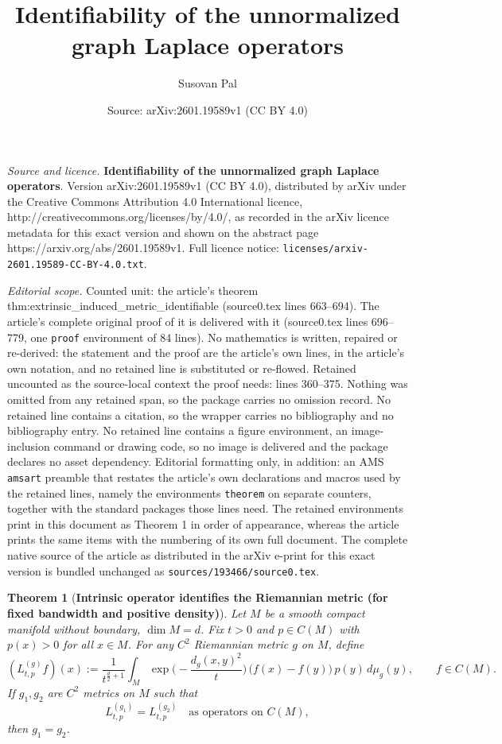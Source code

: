\documentclass[10pt,a4paper]{amsart}
\title{\large \textbf{Identifiability of the unnormalized graph Laplace operators}}
\author{Susovan Pal}
\date{Source: arXiv:2601.19589v1 (CC BY 4.0)}
\newtheorem{theorem}{Theorem}
\begin{document}
\maketitle

\noindent\emph{Source and licence.} \large \textbf{Identifiability of the unnormalized graph Laplace operators}. Version arXiv:2601.19589v1 (CC BY 4.0), distributed by arXiv under the Creative Commons Attribution 4.0 International licence, http://creativecommons.org/licenses/by/4.0/, as recorded in the arXiv licence metadata for this exact version and shown on the abstract page https://arxiv.org/abs/2601.19589v1. Full licence notice: \texttt{licenses/arxiv-2601.19589-CC-BY-4.0.txt}.\par\smallskip

\noindent\textit{Editorial scope.} Counted unit: the article's theorem thm:extrinsic\_induced\_metric\_identifiable (source0.tex lines 663--694). The article's complete original proof of it is delivered with it (source0.tex lines 696--779, one \texttt{proof} environment of 84 lines). No mathematics is written, repaired or re-derived: the statement and the proof are the article's own lines, in the article's own notation, and no retained line is substituted or re-flowed.  Retained uncounted as the source-local context the proof needs: lines 360--375.  Nothing was omitted from any retained span, so the package carries no omission record.  No retained line contains a citation, so the wrapper carries no bibliography and no bibliography entry.  No retained line contains a figure environment, an image-inclusion command or drawing code, so no image is delivered and the package declares no asset dependency.  Editorial formatting only, in addition: an AMS \texttt{amsart} preamble that restates the article's own declarations and macros used by the retained lines, namely the environments \texttt{theorem} on separate counters, together with the standard packages those lines need.  The retained environments print in this document as Theorem 1 in order of appearance, whereas the article prints the same items with the numbering of its own full document.  The complete native source of the article as distributed in the arXiv e-print for this exact version is bundled unchanged as \texttt{sources/193466/source0.tex}.
\begin{theorem}[\textbf{Intrinsic operator identifies the Riemannian metric (for fixed bandwidth and positive density)}]
\label{thm:intrinsic_metric_identifiable}
Let $M$ be a smooth compact manifold without boundary, $\dim M=d$.
Fix $t>0$ and $p\in C(M)$ with $p(x)>0$ for all $x\in M$.
For any $C^2$ Riemannian metric $g$ on $M$, define
\[
(L^{(g)}_{t,p} f)(x)
:=\frac{1}{t^{\frac d2+1}}\int_M \exp\!\Big(-\frac{d_g(x,y)^2}{t}\Big)\,\bigl(f(x)-f(y)\bigr)\,p(y)\,d\mu_g(y),
\qquad f\in C(M).
\]
If $g_1,g_2$ are $C^2$ metrics on $M$ such that
\[
L^{(g_1)}_{t,p}=L^{(g_2)}_{t,p}\quad\text{as operators on }C(M),
\]
then $g_1=g_2$.
\end{theorem}
\end{document}
